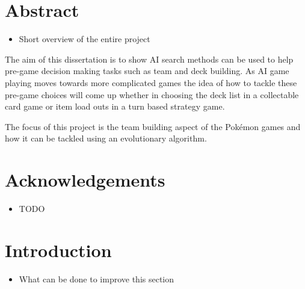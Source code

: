 \documentclass[a4paper]{article}
\newcommand{\Pokemon}{Pok\'{e}mon}
\begin{document}
\setcounter{page}{1}

\section*{Abstract}
\begin{itemize}
    \item Short overview of the entire project
\end{itemize}
The aim of this dissertation is to show AI search methods can be used to help pre-game decision making tasks such as team and deck building.
As AI game playing moves towards more complicated games the idea of how to tackle these pre-game choices will come up whether in choosing the deck list in a collectable card game or item load outs in a turn based strategy game.
\par
The focus of this project is the team building aspect of the \Pokemon{} games and how it can be tackled using an evolutionary algorithm.
\vfill
\section*{Acknowledgements}
\begin{itemize}
    \item TODO
\end{itemize}
\pagebreak

\tableofcontents
\pagebreak
\setcounter{page}{1}

\section{Introduction}
\begin{itemize}
	\item What can be done to improve this section
\end{itemize}
\end{document}

